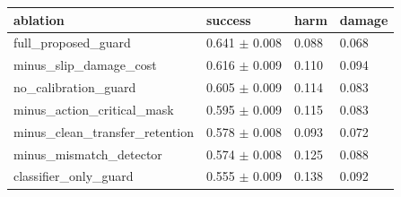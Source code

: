 \begin{tabular}{llll}
\toprule
ablation & success & harm & damage \\
\midrule
full\_proposed\_guard & 0.641 $\pm$ 0.008 & 0.088 & 0.068 \\
minus\_slip\_damage\_cost & 0.616 $\pm$ 0.009 & 0.110 & 0.094 \\
no\_calibration\_guard & 0.605 $\pm$ 0.009 & 0.114 & 0.083 \\
minus\_action\_critical\_mask & 0.595 $\pm$ 0.009 & 0.115 & 0.083 \\
minus\_clean\_transfer\_retention & 0.578 $\pm$ 0.008 & 0.093 & 0.072 \\
minus\_mismatch\_detector & 0.574 $\pm$ 0.008 & 0.125 & 0.088 \\
classifier\_only\_guard & 0.555 $\pm$ 0.009 & 0.138 & 0.092 \\
\bottomrule
\end{tabular}
